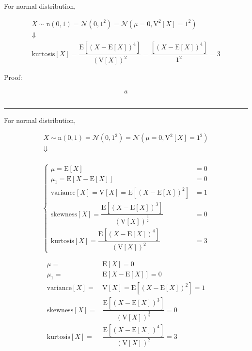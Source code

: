 \documentclass[
]{book}
\theoremstyle{definition}
\theoremstyle{definition}
\theoremstyle{definition}
\theoremstyle{definition}
\theoremstyle{remark}
\begin{document}
For normal distribution,

\[
\begin{array}{c}
X\sim\mathrm{n}\left(0,1\right)=\mathcal{N}\left(0,1^{2}\right)=\mathcal{N}\left(\mu=0,\mathrm{V}^{2}\left[X\right]=1^{2}\right)\\
\Downarrow\\
\mathrm{kurtosis}\left[X\right]=\dfrac{\mathrm{E}\left[\left(X-\mathrm{E}\left[X\right]\right)^{4}\right]}{\left(\mathrm{V}\left[X\right]\right)^{2}}=\dfrac{\left[\left(X-\mathrm{E}\left[X\right]\right)^{4}\right]}{1^{2}}=3
\end{array}
\]

Proof:

\[
\begin{aligned}
a
\end{aligned}
\]

\[
\tag*{$\Box$}
\]

\begin{center}\rule{0.5\linewidth}{0.5pt}\end{center}

For normal distribution,

\[
\begin{array}{c}
X\sim\mathrm{n}\left(0,1\right)=\mathcal{N}\left(0,1^{2}\right)=\mathcal{N}\left(\mu=0,\mathrm{V}^{2}\left[X\right]=1^{2}\right)\\
\Downarrow\\
\end{array}
\]

\[
\begin{cases}
\mu=\mathrm{E}\left[X\right] & =0\\
\mu_{{\scriptscriptstyle 1}}=\mathrm{E}\left[X-\mathrm{E}\left[X\right]\right] & =0\\
\mathrm{variance}\left[X\right]=\mathrm{V}\left[X\right]=\mathrm{E}\left[\left(X-\mathrm{E}\left[X\right]\right)^{2}\right] & =1\\
\mathrm{skewness}\left[X\right]=\dfrac{\mathrm{E}\left[\left(X-\mathrm{E}\left[X\right]\right)^{3}\right]}{\left(\mathrm{V}\left[X\right]\right)^{\frac{3}{2}}} & =0\\
\mathrm{kurtosis}\left[X\right]=\dfrac{\mathrm{E}\left[\left(X-\mathrm{E}\left[X\right]\right)^{4}\right]}{\left(\mathrm{V}\left[X\right]\right)^{2}} & =3
\end{cases}
\]

\[
\begin{aligned}
\mu= & \mathrm{E}\left[X\right]=0\\
\mu_{{\scriptscriptstyle 1}}= & \mathrm{E}\left[X-\mathrm{E}\left[X\right]\right]=0\\
\mathrm{variance}\left[X\right]= & \mathrm{V}\left[X\right]=\mathrm{E}\left[\left(X-\mathrm{E}\left[X\right]\right)^{2}\right]=1\\
\mathrm{skewness}\left[X\right]= & \dfrac{\mathrm{E}\left[\left(X-\mathrm{E}\left[X\right]\right)^{3}\right]}{\left(\mathrm{V}\left[X\right]\right)^{\frac{3}{2}}}=0\\
\mathrm{kurtosis}\left[X\right]= & \dfrac{\mathrm{E}\left[\left(X-\mathrm{E}\left[X\right]\right)^{4}\right]}{\left(\mathrm{V}\left[X\right]\right)^{2}}=3
\end{aligned}
\]
\end{document}
